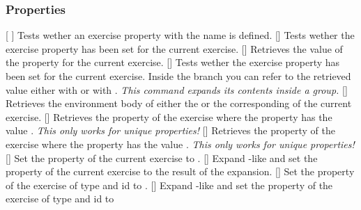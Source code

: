 \documentclass{xsim-manual}
\begin{document}
\subsubsection{Properties}
\begin{commands}
  \expandable{}[%
  ]
    Tests wether an exercise property with the name  is defined.
  []
    Tests wether the exercise property  has been set for the
    current exercise.
  \expandable{}[]
    Retrieves the value of the property  for the current
    exercise.
  []
    Tests wether the exercise property  has been set for the
    current exercise.  Inside the  branch you can refer to the
    retrieved value either with  or with .
    \emph{This command expands its contents inside a group.}
  []
    Retrieves the environment body of either the
     or the corresponding  of the current
    exercise.
  \expandable{}[]
    Retrieves the property  of the exercise where the property
     has the value .  \emph{This only works for
      \emph{unique} properties!}
  []
    Retrieves the property  of the exercise where the
    property  has the value .  \emph{This only
      works for \emph{unique} properties!}
  []
    Set the property  of the current
    exercise to .
  []
    Expand  -like and set the property
     of the current exercise to the result of the expansion.
  []
    Set the property  of the exercise of type
     and id  to .
  []
    Expand  -like and set the property
     of the exercise of type  and id  to

\end{commands}
\end{document}
